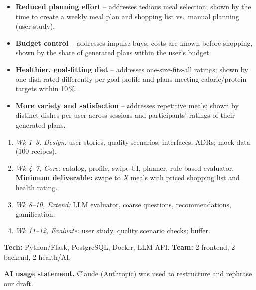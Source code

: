 \documentclass[11pt,a4paper]{article}
\newcommand{\pibapart}[1]{\vspace{0.4em}{\large\textbf{#1}}\par}
\begin{document}
\pibapart{Benefits}
\begin{itemize}
  \item \textbf{Reduced planning effort} -- addresses tedious meal selection; shown by the time to create a weekly meal plan and shopping list vs.\ manual planning (user study).
  \item \textbf{Budget control} -- addresses impulse buys; costs are known before shopping, shown by the share of generated plans within the user's budget.
  \item \textbf{Healthier, goal-fitting diet} -- addresses one-size-fits-all ratings; shown by one dish rated differently per goal profile and plans meeting calorie/protein targets within 10\,\%.
  \item \textbf{More variety and satisfaction} -- addresses repetitive meals; shown by distinct dishes per user across sessions and participants' ratings of their generated plans.
\end{itemize}

\pibapart{Action}
\begin{enumerate}
  \item \emph{Wk 1--3, Design:} user stories, quality scenarios, interfaces, ADRs; mock data (100 recipes).
  \item \emph{Wk 4--7, Core:} catalog, profile, swipe UI, planner, rule-based evaluator.\\
  \textbf{Minimum deliverable:} swipe to $X$ meals with priced shopping list and health rating.
  \item \emph{Wk 8--10, Extend:} LLM evaluator, coarse questions, recommendations, gamification.
  \item \emph{Wk 11--12, Evaluate:} user study, quality scenario checks; buffer.
\end{enumerate}
\textbf{Tech:} Python/Flask, PostgreSQL, Docker, LLM API.
\textbf{Team:} 2 frontend, 2 backend, 2 health/AI.

\vfill
{\small\textbf{AI usage statement.} Claude (Anthropic) was used to restructure and rephrase our draft.}
\end{document}

